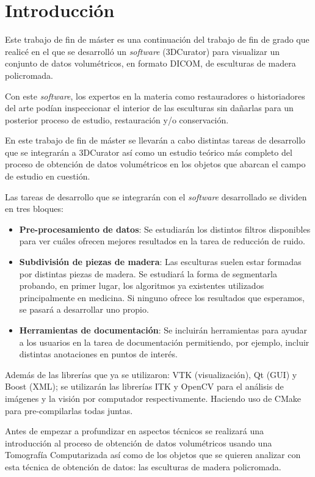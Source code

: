 \chapter{Introducción}

Este trabajo de fin de máster es una continuación del trabajo de fin de grado que realicé en el que se desarrolló un \textit{software} (3DCurator) para visualizar un conjunto de datos volumétricos, en formato DICOM, de esculturas de madera policromada.

Con este \textit{software}, los expertos en la materia como restauradores o historiadores del arte podían inspeccionar el interior de las esculturas sin dañarlas para un posterior proceso de estudio, restauración y/o conservación.

En este trabajo de fin de máster se llevarán a cabo distintas tareas de desarrollo que se integrarán a 3DCurator así como un estudio teórico más completo del proceso de obtención de datos volumétricos en los objetos que abarcan el campo de estudio en cuestión.

Las tareas de desarrollo que se integrarán con el \textit{software} desarrollado se dividen en tres bloques:

\begin{itemize}
	\item \textbf{Pre-procesamiento de datos}: Se estudiarán los distintos filtros disponibles para ver cuáles ofrecen mejores resultados en la tarea de reducción de ruido.
	\item \textbf{Subdivisión de piezas de madera}: Las esculturas suelen estar formadas por distintas piezas de madera. Se estudiará la forma de segmentarla probando, en primer lugar, los algoritmos ya existentes utilizados principalmente en medicina. Si ninguno ofrece los resultados que esperamos, se pasará a desarrollar uno propio.
	\item \textbf{Herramientas de documentación}: Se incluirán herramientas para ayudar a los usuarios en la tarea de documentación permitiendo, por ejemplo, incluir distintas anotaciones en puntos de interés.
\end{itemize}

Además de las librerías que ya se utilizaron: VTK \cite{vtk} (visualización), Qt \cite{qt} (GUI) y Boost \cite{boost} (XML); se utilizarán las librerías ITK \cite{itk} y OpenCV \cite{opencv} para el análisis de imágenes y la visión por computador respectivamente. Haciendo uso de CMake \cite{cmake} para pre-compilarlas todas juntas.

Antes de empezar a profundizar en aspectos técnicos se realizará una introducción al proceso de obtención de datos volumétricos usando una Tomografía Computarizada así como de los objetos que se quieren analizar con esta técnica de obtención de datos: las esculturas de madera policromada.

